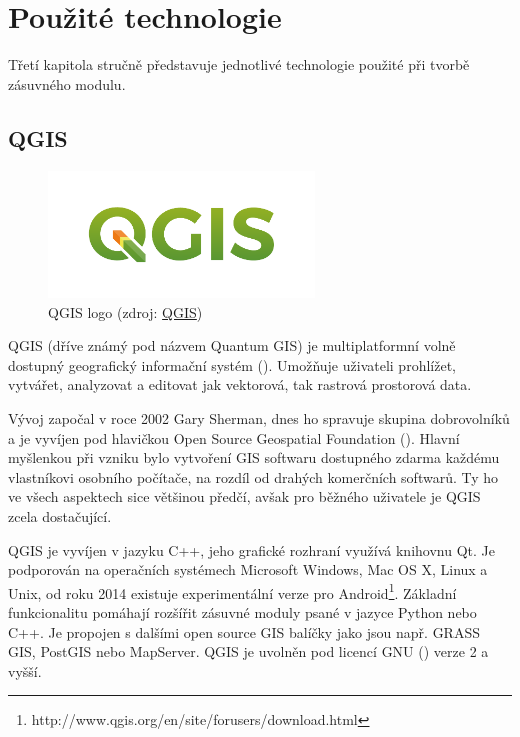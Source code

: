 \chapter{Použité technologie}
\label{3-technologie}

Třetí kapitola stručně představuje jednotlivé technologie použité při
tvorbě zásuvného modulu.

\section{QGIS}

\begin{figure}[H] \centering
      \includegraphics[width=200pt]{./pictures/qgis-logo.png}
      \caption[QGIS logo]{QGIS logo (zdroj:
\href{https://www.qgis.org/en/_downloads/qgis-logo.png}{QGIS})}
      \label{fig:qgis}
  \end{figure}

QGIS (dříve známý pod názvem Quantum GIS) je multiplatformní volně
dostupný geografický informační systém (). Umožňuje uživateli
prohlížet, vytvářet, analyzovat a editovat jak vektorová, tak rastrová
prostorová data.

Vývoj započal v roce 2002 Gary Sherman, dnes ho spravuje skupina
dobrovolníků a je vyvíjen pod hlavičkou Open Source Geospatial
Foundation (). Hlavní myšlenkou při vzniku bylo vytvoření
GIS softwaru dostupného zdarma každému vlastníkovi osobního počítače,
na rozdíl od drahých komerčních softwarů. Ty ho ve všech aspektech
sice většinou předčí, avšak pro běžného uživatele je QGIS zcela
dostačující.

QGIS je vyvíjen v jazyku C++, jeho grafické rozhraní využívá knihovnu
Qt. Je podporován na operačních systémech Microsoft Windows, Mac OS X,
Linux a Unix, od roku 2014 existuje experimentální verze pro
Android\footnote{http://www.qgis.org/en/site/forusers/download.html}. Základní
funkcionalitu pomáhají rozšířit zásuvné moduly psané v jazyce Python
nebo C++. Je propojen s dalšími open source GIS balíčky jako jsou
např. GRASS GIS, PostGIS nebo MapServer. QGIS je uvolněn pod licencí
GNU () verze 2 a vyšší.

